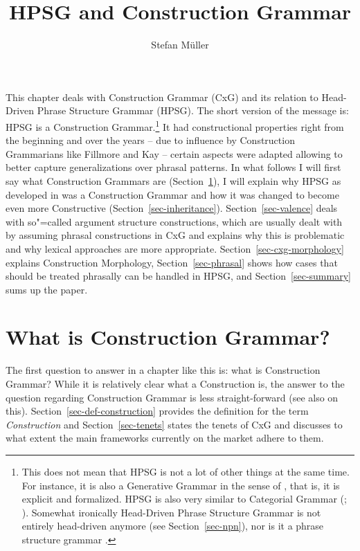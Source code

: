 \documentclass[output=paper]{langsci/langscibook}
\author{Stefan Müller\affiliation{Humboldt-Universität zu Berlin}}
\title{HPSG and Construction Grammar}
\begin{document}
\label{firstpage-cxg}\label{chap-cxg}

\noindent
This chapter deals with Construction Grammar (CxG) and its relation to Head-Driven Phrase Structure
Grammar (HPSG). The short version of the message is: HPSG is a Construction Grammar.\footnote{%
  This does not mean that HPSG is not a lot of other things at the same time. For instance, it is
  also a Generative Grammar in the sense of \citep[]{Chomsky65a}, that is, it is explicit and
  formalized. HPSG is also very similar to Categorial Grammar (\citealt{MuellerUnifying};
  ). Somewhat ironically Head-Driven Phrase Structure Grammar is not entirely
  head-driven anymore (see Section~\ref{sec-npn}), nor is it a phrase structure grammar .
}
It had constructional properties right from the beginning and over the years -- due to influence by
Construction Grammarians like Fillmore and Kay -- certain aspects were adapted allowing to better
capture generalizations over phrasal patterns. In what follows I will first say what Construction
Grammars are (Section~\ref{sec-cxg}), I will explain why HPSG as developed in  was a
Construction Grammar and how it was changed to become even more Constructive
(Section~\ref{sec-inheritance}). Section~\ref{sec-valence} deals with so"=called argument structure
constructions, which are usually dealt with by assuming phrasal constructions in CxG and explains
why this is problematic and why lexical approaches are more appropriate. Section~\ref{sec-cxg-morphology} explains
Construction Morphology, Section~\ref{sec-phrasal} shows how cases that should be treated phrasally
can be handled in HPSG, and Section~\ref{sec-summary} sums up the paper.

\section{What is Construction Grammar?}
\label{sec-cxg}


The first question to answer in a chapter like this is: what is Construction Grammar? While it is
relatively clear what a Construction is, the answer to the question regarding Construction Grammar
is less straight-forward (see also \citealt[]{Fillmore88a} on this). Section~\ref{sec-def-construction} provides the definition for the term
\emph{Construction} and Section~\ref{sec-tenets} states the tenets of CxG and discusses to what
extent the main frameworks currently on the market adhere to them.
\end{document}
